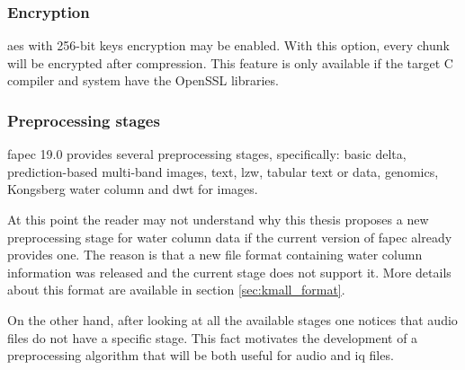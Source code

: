 \subsubsection{Encryption}
\acrshort{aes} with 256-bit keys encryption may be enabled. With this option, every chunk will be encrypted after compression. This feature is only available if the target C compiler and system have the OpenSSL libraries.

\subsubsection{Preprocessing stages}
\acrshort{fapec} 19.0 provides several preprocessing stages, specifically: basic delta, prediction-based multi-band images, text, \acrshort{lzw}, tabular text or data, genomics, Kongsberg water column and \acrshort{dwt} for images.

At this point the reader may not understand why this thesis proposes a new preprocessing stage for water column data if the current version of \acrshort{fapec} already provides one. The reason is that a new file format containing water column information was released and the current stage does not support it. More details about this format are available in section \ref{sec:kmall_format}.

On the other hand, after looking at all the available stages one notices that audio files do not have a specific stage. This fact motivates the development of a preprocessing algorithm that will be both useful for audio and \acrshort{iq} files.
